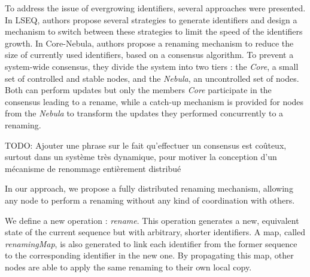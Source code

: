\documentclass{article}
\begin{document}
To address the issue of evergrowing identifiers, several approaches were presented.
In LSEQ, authors propose several strategies to generate identifiers and design a mechanism to switch between these strategies to limit the speed of the identifiers growth.
In Core-Nebula, authors propose a renaming mechanism to reduce the size of currently used identifiers, based on a consensus algorithm.
To prevent a system-wide consensus, they divide the system into two tiers : the \emph{Core}, a small set of controlled and stable nodes, and the \emph{Nebula}, an uncontrolled set of nodes.
Both can perform updates but only the members \emph{Core} participate in the consensus leading to a rename, while a catch-up mechanism is provided for nodes from the \emph{Nebula} to transform the updates they performed concurrently to a renaming.

TODO: Ajouter une phrase sur le fait qu'effectuer un consensus est coûteux, surtout dans un système très dynamique, pour motiver la conception d'un mécanisme de renommage entièrement distribué

In our approach, we propose a fully distributed renaming mechanism, allowing any node to perform a renaming without any kind of coordination with others.



We define a new operation : \emph{rename}.
This operation generates a new, equivalent state of the current sequence but with arbitrary, shorter identifiers.
A map, called \emph{renamingMap}, is also generated to link each identifier from the former sequence to the corresponding identifier in the new one.
By propagating this map, other nodes are able to apply the same renaming to their own local copy.
\end{document}
